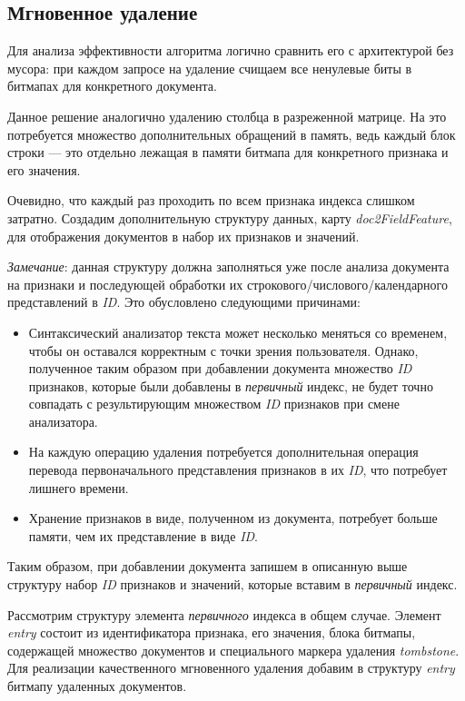 \subsection{Мгновенное удаление}

Для анализа эффективности алгоритма логично сравнить его с архитектурой без мусора:
при каждом запросе на удаление счищаем все ненулевые биты в битмапах для конкретного
документа.

Данное решение аналогично удалению столбца в разреженной матрице. На это потребуется
множество дополнительных обращений в память, ведь каждый блок строки — это
отдельно лежащая в памяти битмапа для конкретного признака и его значения.

Очевидно, что каждый раз проходить по всем признака индекса слишком затратно. Создадим
дополнительную структуру данных, карту \textit{doc2FieldFeature}, для отображения
документов в набор их признаков и значений.

\textit{Замечание}: данная структуру должна заполняться уже после анализа документа на
признаки и последующей обработки их строкового/числового/календарного
представлений в \textit{ID}. Это обусловлено следующими причинами:
\begin{itemize}
    \item Синтаксический анализатор текста может несколько меняться со временем,
    чтобы он оставался корректным с точки зрения пользователя. Однако,
    полученное таким образом при добавлении документа множество \textit{ID} признаков,
    которые были добавлены в \textit{первичный} индекс, не будет точно совпадать с
    результирующим множеством \textit{ID} признаков при смене анализатора.
    \item На каждую операцию удаления потребуется дополнительная операция перевода
    первоначального представления признаков в их \textit{ID}, что потребует лишнего
    времени.
    \item Хранение признаков в виде, полученном из документа, потребует больше
    памяти, чем их представление в виде \textit{ID}.
\end{itemize}

Таким образом, при добавлении документа запишем в описанную выше структуру набор
\textit{ID} признаков и значений, которые вставим в \textit{первичный} индекс.

Рассмотрим структуру элемента \textit{первичного} индекса в общем случае. Элемент
\textit{entry} состоит из идентификатора признака, его значения, блока битмапы,
содержащей множество документов и специального маркера удаления
\textit{tombstone}. Для реализации качественного мгновенного удаления добавим в
структуру \textit{entry} битмапу удаленных документов.

